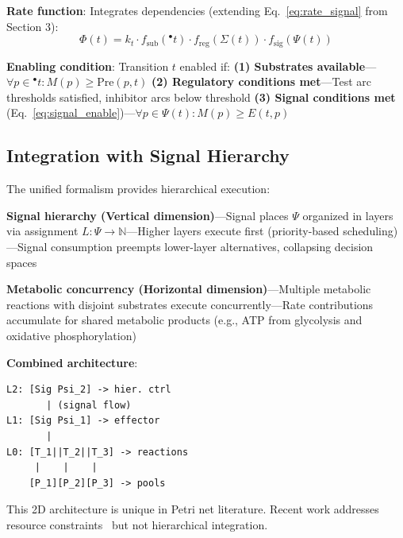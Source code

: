\vspace{3pt}
\noindent\textbf{Rate function}: Integrates dependencies (extending Eq.~\ref{eq:rate_signal} from Section 3):
\begin{equation}
\label{eq:rate_function}
\Phi(t) = k_t \cdot f_{\text{sub}}({}^\bullet t) \cdot f_{\text{reg}}(\Sigma(t)) \cdot f_{\text{sig}}(\Psi(t))
\end{equation}

\vspace{3pt}
\noindent\textbf{Enabling condition}: Transition $t$ enabled if: \textbf{(1) Substrates available}---$\forall p \in {}^\bullet t: M(p) \geq \text{Pre}(p, t)$ \textbf{(2) Regulatory conditions met}---Test arc thresholds satisfied, inhibitor arcs below threshold \textbf{(3) Signal conditions met} (Eq.~\ref{eq:signal_enable})---$\forall p \in \Psi(t): M(p) \geq E(t, p)$

\subsection{Integration with Signal Hierarchy}

\vspace{3pt}
\noindent The unified formalism provides hierarchical execution:

\vspace{3pt}
\noindent\textbf{Signal hierarchy (Vertical dimension)}---Signal places $\Psi$ organized in layers via assignment $L: \Psi \to \mathbb{N}$---Higher layers execute first (priority-based scheduling)---Signal consumption preempts lower-layer alternatives, collapsing decision spaces

\vspace{3pt}
\noindent\textbf{Metabolic concurrency (Horizontal dimension)}---Multiple metabolic reactions with disjoint substrates execute concurrently---Rate contributions accumulate for shared metabolic products (e.g., ATP from glycolysis and oxidative phosphorylation)

\vspace{3pt}
\noindent\textbf{Combined architecture}:
\begin{center}
\begin{verbatim}
L2: [Sig Psi_2] -> hier. ctrl
       | (signal flow)
L1: [Sig Psi_1] -> effector
       |
L0: [T_1||T_2||T_3] -> reactions
     |    |    |
    [P_1][P_2][P_3] -> pools
\end{verbatim}
\end{center}

\vspace{3pt}
\noindent This 2D architecture is unique in Petri net literature. Recent work addresses resource constraints~\cite{genovese2021} but not hierarchical integration.
